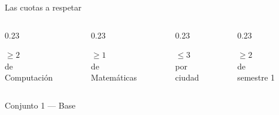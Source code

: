 \documentclass[aspectratio=169, 10pt]{beamer}
\begin{document}
\begin{frame}{Las \alert{cuotas} a respetar}
  \vspace{0.3cm}
  \begin{columns}[c]
    \begin{column}{0.23\textwidth}
      \begin{tarjeta}
        \begin{center}
          {\normalsize\bfseries $\geq 2$}\\[2pt]
          {\footnotesize\color{cgris} de\\Computación}
        \end{center}
      \end{tarjeta}
    \end{column}
    \begin{column}{0.23\textwidth}
      \begin{tarjeta}
        \begin{center}
          {\normalsize\bfseries $\geq 1$}\\[2pt]
          {\footnotesize\color{cgris} de\\Matemáticas}
        \end{center}
      \end{tarjeta}
    \end{column}
    \begin{column}{0.23\textwidth}
      \begin{tarjeta}
        \begin{center}
          {\normalsize\bfseries $\leq 3$}\\[2pt]
          {\footnotesize\color{cgris} por\\ciudad}
        \end{center}
      \end{tarjeta}
    \end{column}
    \begin{column}{0.23\textwidth}
      \begin{tarjeta}
        \begin{center}
          {\normalsize\bfseries $\geq 2$}\\[2pt]
          {\footnotesize\color{cgris} de\\semestre 1}
        \end{center}
      \end{tarjeta}
    \end{column}
  \end{columns}
  \vspace{0.5cm}
  \begin{center}
    {\footnotesize\color{cgris} Conjunto 1 — Base}
  \end{center}
\end{frame}
\end{document}
